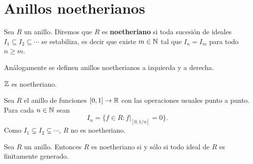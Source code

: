 \chapter{Anillos noetherianos}

\begin{definition}
Sea $R$ un anillo. Diremos que $R$ es \textbf{noetheriano} si toda sucesión de ideales $I_1\subseteq I_2\subseteq\cdots $ se estabiliza, es decir que existe $m\in\mathbb{N}$ tal que 
$I_n=I_m$ para todo $n\geq m$. 
\end{definition}

Análogamente se definen anillos noetherianos a izquierda y a derecha. 


\begin{example}
$\mathbb{Z}$ es noetheriano.
\end{example}

%
\begin{example}
Sea $R$ el anillo de funciones $[0,1]\to\mathbb{R}$ 
con las operaciones usuales punto a punto. Para cada $n\in\mathbb{N}$ sean  
\[
I_n=\{f\in R:f|_{[0,1/n]}=0\}.
\]
Como $I_1\subsetneq I_2\subsetneq\cdots$, $R$ no es noetheriano. 
\end{example}

\begin{theorem}
	Sea $R$ un anillo. Entonces $R$ es noetheriano si y sólo si todo ideal de $R$ es finitamente generado.
\end{theorem}

